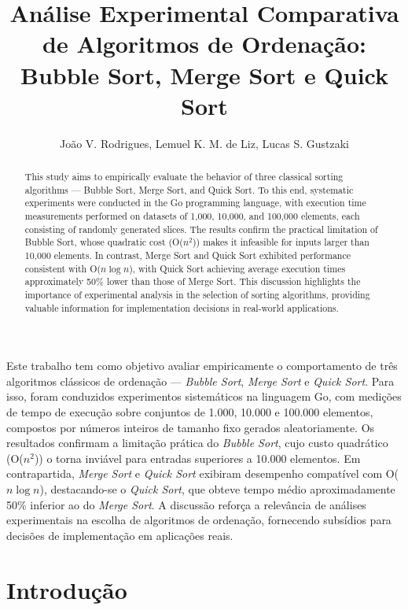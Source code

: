 \documentclass[12pt]{article}
\title{Análise Experimental Comparativa de Algoritmos de Ordenação: Bubble Sort, Merge Sort e Quick Sort}
\author{João V. Rodrigues\inst{1}, Lemuel K. M. de Liz\inst{1}, Lucas S. Gustzaki\inst{1}}
\begin{document}
 

\maketitle

\begin{abstract}
This study aims to empirically evaluate the behavior of three classical sorting algorithms --- Bubble Sort, Merge Sort, and Quick Sort. To this end, systematic experiments were conducted in the Go programming language, with execution time measurements performed on datasets of 1,000, 10,000, and 100,000 elements, each consisting of randomly generated slices. The results confirm the practical limitation of Bubble Sort, whose quadratic cost (O($n^2$)) makes it infeasible for inputs larger than 10,000 elements. In contrast, Merge Sort and Quick Sort exhibited performance consistent with O($n \log n$), with Quick Sort achieving average execution times approximately 50\% lower than those of Merge Sort. This discussion highlights the importance of experimental analysis in the selection of sorting algorithms, providing valuable information for implementation decisions in real-world applications.
\end{abstract}
     
\begin{resumo} 
Este trabalho tem como objetivo avaliar empiricamente o comportamento de três algoritmos clássicos de ordenação --- \textit{Bubble Sort}, \textit{Merge Sort} e \textit{Quick Sort}. Para isso, foram conduzidos experimentos sistemáticos na linguagem Go, com medições de tempo de execução sobre conjuntos de 1.000, 10.000 e 100.000 elementos, compostos por números inteiros de tamanho fixo gerados aleatoriamente. Os resultados confirmam a limitação prática do \textit{Bubble Sort}, cujo custo quadrático (O($n^2$)) o torna inviável para entradas superiores a 10.000 elementos. Em contrapartida, \textit{Merge Sort} e \textit{Quick Sort} exibiram desempenho compatível com O($n \log n$), destacando-se o \textit{Quick Sort}, que obteve tempo médio aproximadamente 50\% inferior ao do \textit{Merge Sort}. A discussão reforça a relevância de análises experimentais na escolha de algoritmos de ordenação, fornecendo subsídios para decisões de implementação em aplicações reais.
\end{resumo}

\section{Introdução}
\end{document}
